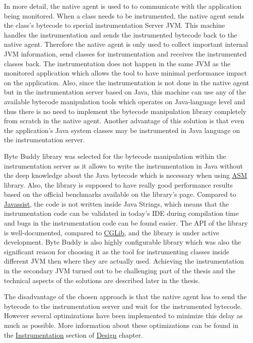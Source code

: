 In more detail, the native agent is used to to communicate with the application being monitored. When a class needs to be instrumented, the native agent sends the class's bytecode to special instrumentation Server JVM. This machine handles the instrumentation and sends the instrumented bytecode back to the native agent. Therefore the native agent is only used to collect important internal JVM information, send classes for instrumentation and receives the instrumented classes back. The instrumentation does not happen in the same JVM as the monitored application which allows the tool to have minimal performance impact on the application. Also, since the instrumentation is not done in the native agent  but in the instrumentation server based on Java, this machine can use any of the available bytecode manipulation tools which operates on Java-language level and thus there is no need to implement the bytecode manipulation library completely from scratch in the native agent. Another advantage of this solution is that even the application's Java system classes may be instrumented in Java language on the instrumentation server.

Byte Buddy library was selected for the bytecode manipulation within the instrumentation server  as it allows to write the instrumentation in Java without the deep knowledge about the Java bytecode which is necessary when using \hyperref[asm]{ASM} library. Also, the library is supposed to have really good performance results based on the official benchmarks available on the library's page. Compared to \hyperref[javassist]{Javassist}, the code is not written inside Java Strings, which means that the instrumentation code can be validated in today's IDE during compilation time and bugs in the instrumentation code can be found easier. The API of the library is well-documented, compared to \hyperref[cglib]{CGLib}, and the library is under active development. Byte Buddy is also highly configurable library which was also the significant reason for choosing it as the tool for instrumenting classes inside different JVM then where they are actually used. Achieving the instrumentation in the secondary JVM  turned out to be challenging part of the thesis and the technical aspects of the solutions are described later in the thesis.

The disadvantage of the chosen approach is that the native agent has to send the bytecode to the instrumentation server and wait for the instrumented bytecode. However several optimizations have been implemented to minimize this delay as much as possible. More information about these optimizations can be found in the \hyperref[sec:inst_server]{Instrumentation} section of \hyperref[chap:design]{Design} chapter.
			
